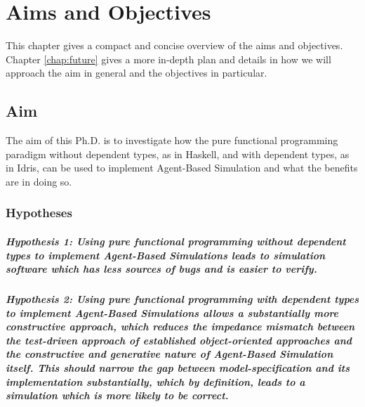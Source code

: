 \chapter{Aims and Objectives}
\label{chap:aimsObj}

This chapter gives a compact and concise overview of the aims and objectives. Chapter \ref{chap:future} gives a more in-depth plan and details in how we will approach the aim in general and the objectives in particular.

\section{Aim}
The aim of this Ph.D. is to investigate how the pure functional programming paradigm without dependent types, as in Haskell, and with dependent types, as in Idris, can be used to implement Agent-Based Simulation and what the benefits are in doing so.

\subsection{Hypotheses}
\paragraph{Hypothesis 1: Using pure functional programming without dependent types to implement Agent-Based Simulations leads to simulation software which has less sources of bugs and is easier to verify.} %

\paragraph{Hypothesis 2: Using pure functional programming with dependent types to implement Agent-Based Simulations allows a substantially more constructive approach, which reduces the impedance mismatch between the test-driven approach of established object-oriented approaches and the constructive and generative nature of Agent-Based Simulation itself. This should narrow the gap between model-specification and its implementation substantially, which by definition, leads to a simulation which is more likely to be correct.}

